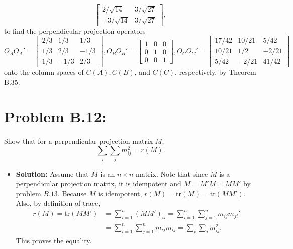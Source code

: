 \documentclass[11pt]{article}
\begin{document}
\begin{itemize}
\[\begin{bmatrix}
2/\sqrt{14} & 3/\sqrt{27} \\
-3/\sqrt{14} & 3/\sqrt{27}
\end{bmatrix},
\]
to find the perpendicular projection operators
\[
O_AO_A' = \begin{bmatrix}
2/3 & 1 / 3 & 1 / 3 \\
1 / 3 & 2/3 & -1/3 \\
1 / 3 & -1/3 & 2/3
\end{bmatrix}, O_BO_B' = \begin{bmatrix}
1 & 0 & 0 \\
0 & 1 & 0 \\
0 & 0 & 1
\end{bmatrix}, O_CO_C' = \begin{bmatrix}
17 / 42 & 10/21 & 5/42 \\
10/21 & 1 / 2 & -2/21 \\
5 / 42 & -2 / 21 & 41 / 42
\end{bmatrix}
\]
onto the column spaces of $C(A), C(B)$, and $C(C)$, respectively, by Theorem B.35.
\end{itemize}
\section*{Problem B.12:}
Show that for a perpendicular projection matrix $M$, 
\[
\sum_i\sum_j m_{ij}^2 = r(M).
\]
\begin{itemize}
\item[] {\bf Solution:}  Assume that $M$ is an $n\times n$ matrix.  Note that since $M$ is a perpendicular projection matrix, it is idempotent and $M=M'M = MM'$ by problem $B.13$.  Because $M$ is idempotent, $r(M) = \text{tr}(M) = \text{tr}(MM')$.  Also, by definition of trace,
\begin{align*}
r(M) = \text{tr}(MM') &= \sum_{i=1}^n (MM')_{ii} = \sum_{i=1}^n\sum_{j=1}^n m_{ij}m_{ji}' \\
&= \sum_{i=1}^n\sum_{j=1}^nm_{ij}m_{ij} = \sum_i\sum_j m_{ij}^2.
\end{align*}
This proves the equality.
\end{itemize}
\end{document}
